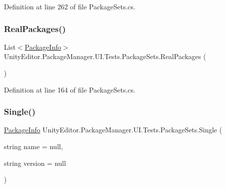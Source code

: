 Definition at line 262 of file Package\+Sets.\+cs.

\mbox{\label{class_unity_editor_1_1_package_manager_1_1_u_i_1_1_tests_1_1_package_sets_ad9930d9a3808998a21b66f8df56f82f1}} 
\subsubsection{\texorpdfstring{RealPackages()}{RealPackages()}}
{\footnotesize\ttfamily List$<$\mbox{\hyperlink{class_unity_editor_1_1_package_manager_1_1_u_i_1_1_package_info}{Package\+Info}}$>$ Unity\+Editor.\+Package\+Manager.\+U\+I.\+Tests.\+Package\+Sets.\+Real\+Packages (\begin{DoxyParamCaption}{ }\end{DoxyParamCaption})}



Definition at line 164 of file Package\+Sets.\+cs.

\mbox{\label{class_unity_editor_1_1_package_manager_1_1_u_i_1_1_tests_1_1_package_sets_a7a674621cd6993b95bf2f727f713bf62}} 
\subsubsection{\texorpdfstring{Single()}{Single()}\hspace{0.1cm}{\footnotesize\ttfamily [1/2]}}
{\footnotesize\ttfamily \mbox{\hyperlink{class_unity_editor_1_1_package_manager_1_1_u_i_1_1_package_info}{Package\+Info}} Unity\+Editor.\+Package\+Manager.\+U\+I.\+Tests.\+Package\+Sets.\+Single (\begin{DoxyParamCaption}\item[{string}]{name = {\ttfamily null},  }\item[{string}]{version = {\ttfamily null} }\end{DoxyParamCaption})}



